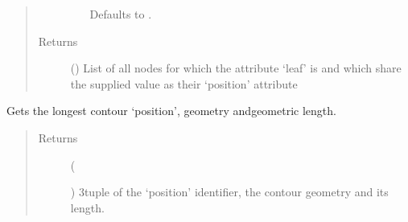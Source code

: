 \documentclass[letterpaper,10pt,english]{sphinxmanual}
\begin{document}
\begin{fulllineitems}
\begin{fulllineitems}
\begin{quote}
\begin{description}
\begin{itemize}
Defaults to .


\end{itemize}

\item[{Returns}] \leavevmode
{} () \textendash{} List of all nodes for which the attribute ‘leaf’ is  and
which share the supplied value as their ‘position’ attribute

\end{description}\end{quote}

\end{fulllineitems}


\begin{fulllineitems}
\label{\detokenize{cockatoo:cockatoo.KnitNetworkBase.longest_position_contour}}
Gets the longest contour ‘position’, geometry andgeometric length.
\begin{quote}\begin{description}
\item[{Returns}] \leavevmode
{} (%
\begin{footnote}[89]\sphinxAtStartFootnote
{}
%
\end{footnote}) \textendash{} 3\sphinxhyphen{}tuple of the ‘position’ identifier, the contour geometry and its
length.

\end{description}\end{quote}

\end{fulllineitems}



\end{fulllineitems}
\end{document}
